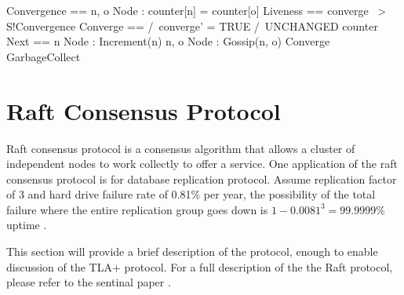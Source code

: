 \documentclass{report}
\begin{document}
\begin{tla}
Convergence == \A n, o \in Node : counter[n] = counter[o]
Liveness == converge ~> S!Convergence
Converge ==
    /\ converge' = TRUE
    /\ UNCHANGED counter  
Next ==
  \/ \E n \in Node : Increment(n)
  \/ \E n, o \in Node : Gossip(n, o)
  \/ Converge
  \/ GarbageCollect
\end{tla}
\begin{tlatex}
%
%
%
\end{tlatex}


\chapter{Raft Consensus Protocol}

Raft consensus protocol is a consensus algorithm that allows a cluster of
independent nodes to work collectly to offer a service. One application of the
raft consensus protocol is for database replication protocol. Assume replication 
factor of 3 and hard drive failure rate of 0.81\% per year, the possibility of 
the total failure where the entire replication group goes down is $1-0.0081^3 =
99.9999\%$ uptime \cite{backblaze}.\newline

This section will provide a brief description of the protocol, enough to enable
discussion of the TLA+ protocol. For a full description of the the Raft
protocol, please refer to the sentinal paper \cite{raft}.\newline
\end{document}
